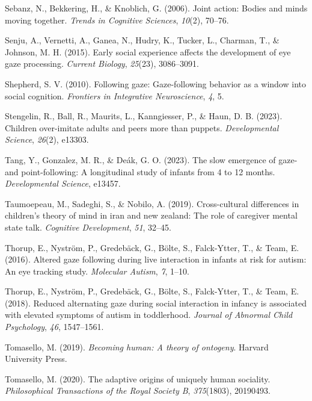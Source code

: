 \documentclass[
  man,floatsintext]{apa7}
\newlength{\cslhangindent}
\newenvironment{CSLReferences}[2] %
 {\begin{list}{}{%
  \setlength{\itemindent}{0pt}
  \setlength{\leftmargin}{0pt}
  \setlength{\parsep}{0pt}
  \ifodd #1
   \setlength{\leftmargin}{\cslhangindent}
   \setlength{\itemindent}{-1\cslhangindent}
  \fi
  \setlength{\itemsep}{#2\baselineskip}}}
 {\end{list}}
\begin{document}
\begin{CSLReferences}{1}{0}
Sebanz, N., Bekkering, H., \& Knoblich, G. (2006). Joint action: Bodies and minds moving together. \emph{Trends in Cognitive Sciences}, \emph{10}(2), 70--76.

Senju, A., Vernetti, A., Ganea, N., Hudry, K., Tucker, L., Charman, T., \& Johnson, M. H. (2015). Early social experience affects the development of eye gaze processing. \emph{Current Biology}, \emph{25}(23), 3086--3091.

Shepherd, S. V. (2010). Following gaze: Gaze-following behavior as a window into social cognition. \emph{Frontiers in Integrative Neuroscience}, \emph{4}, 5.

Stengelin, R., Ball, R., Maurits, L., Kanngiesser, P., \& Haun, D. B. (2023). Children over-imitate adults and peers more than puppets. \emph{Developmental Science}, \emph{26}(2), e13303.

Tang, Y., Gonzalez, M. R., \& Deák, G. O. (2023). The slow emergence of gaze-and point-following: A longitudinal study of infants from 4 to 12 months. \emph{Developmental Science}, e13457.

Taumoepeau, M., Sadeghi, S., \& Nobilo, A. (2019). Cross-cultural differences in children's theory of mind in iran and new zealand: The role of caregiver mental state talk. \emph{Cognitive Development}, \emph{51}, 32--45.

Thorup, E., Nyström, P., Gredebäck, G., Bölte, S., Falck-Ytter, T., \& Team, E. (2016). Altered gaze following during live interaction in infants at risk for autism: An eye tracking study. \emph{Molecular Autism}, \emph{7}, 1--10.

Thorup, E., Nyström, P., Gredebäck, G., Bölte, S., Falck-Ytter, T., \& Team, E. (2018). Reduced alternating gaze during social interaction in infancy is associated with elevated symptoms of autism in toddlerhood. \emph{Journal of Abnormal Child Psychology}, \emph{46}, 1547--1561.

Tomasello, M. (2019). \emph{Becoming human: A theory of ontogeny}. Harvard University Press.

Tomasello, M. (2020). The adaptive origins of uniquely human sociality. \emph{Philosophical Transactions of the Royal Society B}, \emph{375}(1803), 20190493.


\end{CSLReferences}
\end{document}
